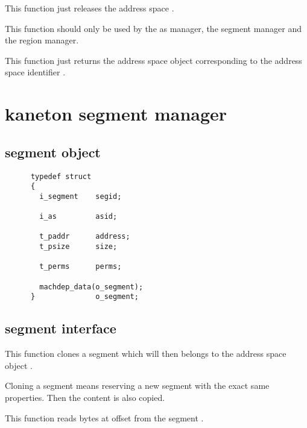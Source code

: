 	 {
	   This function just releases the address space .
	 }

	 {
	   This function should only be used by the as manager, the segment
	   manager and the region manager.

	   This function just returns the address space object
	   corresponding to the address space identifier .
	 }



\section*{kaneton segment manager}

\subsection*{segment object}

\begin{verbatim}
      typedef struct
      {
        i_segment    segid;

        i_as         asid;

        t_paddr      address;
        t_psize      size;

        t_perms      perms;

        machdep_data(o_segment);
      }              o_segment;
\end{verbatim}

\subsection*{segment interface}

	 {
	   This function clones a segment which will then belongs to
	   the address space object .

	   Cloning a segment means reserving a new segment with the
	   exact same properties. Then the content is also copied.
	 }

	 {
	   This function reads  bytes at offset
	    from the segment .
	 }

